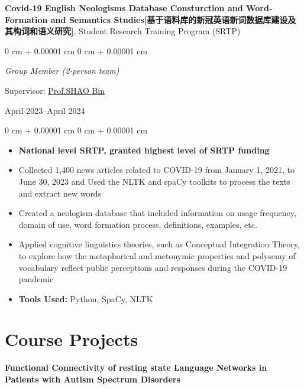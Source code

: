 \documentclass[10pt, letterpaper]{article}
\newenvironment{highlights}{
    \begin{itemize}[
        topsep=0.10 cm,
        parsep=0.10 cm,
        partopsep=0pt,
        itemsep=0pt,
        leftmargin=0 cm + 10pt
    ]
}{
    \end{itemize}
} %
\newenvironment{onecolentry}{
    \begin{adjustwidth}{
        0 cm + 0.00001 cm
    }{
        0 cm + 0.00001 cm
    }
}{
    \end{adjustwidth}
} %
\newenvironment{twocolentry}[2][]{
    \onecolentry
    \def\secondColumn{#2}
    \setcolumnwidth{\fill, 4.5 cm}
    \begin{paracol}{2}
}{
    \switchcolumn \raggedleft \secondColumn
    \end{paracol}
    \endonecolentry
} %
\let\hrefWithoutArrow\href
\begin{document}
    \vspace{0.3 cm}

    \textbf{Covid-19 English Neologisms Database Consturction and Word-Formation and Semantics Studies[基于语料库的新冠英语新词数据库建设及其构词和语义研究]}, Student Research Training Program (SRTP)

    \vspace{0.10 cm}

    \begin{twocolentry}{
        April 2023–April 2024
    }
       \textit{Group Member (2-person team)}
        \item Supervisor: \hrefWithoutArrow{https://person.zju.edu.cn/0019161#942922}{Prof.SHAO Bin}
    
    \end{twocolentry}

    \vspace{0.10 cm}
    \begin{onecolentry}
        \begin{highlights}
            \item \textbf{National level SRTP, granted highest level of SRTP funding}
            \item Collected 1,400 news articles related to COVID-19 from January 1, 2021, to June 30, 2023 and Used the NLTK and spaCy toolkits to process the texts and extract new words
            \item Created a neologism database that included information on usage frequency, domain of use, word formation process, definitions, examples, etc.
            \item Applied cognitive linguistics theories, such as Conceptual Integration Theory, to explore how the metaphorical and metonymic properties and polysemy of vocabulary reflect public perceptions and responses during the COVID-19 pandemic
            \item \textbf{Tools Used:} Python, SpaCy, NLTK
        \end{highlights}
    \end{onecolentry}
    
\section{Course Projects}


        \textbf{Functional Connectivity of resting state Language Networks in Patients with Autism Spectrum Disorders}
\end{document}
